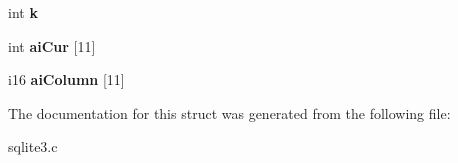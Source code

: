 \begin{DoxyCompactItemize}
\item 
int {\bfseries k}\hypertarget{structWhereScan_a51bec89116185e0a611cd4d7fed8847c}{}\label{structWhereScan_a51bec89116185e0a611cd4d7fed8847c}

\item 
int {\bfseries ai\+Cur} \mbox{[}11\mbox{]}\hypertarget{structWhereScan_a0795799165cb58df1402063f03daf1a6}{}\label{structWhereScan_a0795799165cb58df1402063f03daf1a6}

\item 
i16 {\bfseries ai\+Column} \mbox{[}11\mbox{]}\hypertarget{structWhereScan_a5a55fc1ad5f48ef922ea89c9603f8f38}{}\label{structWhereScan_a5a55fc1ad5f48ef922ea89c9603f8f38}

\end{DoxyCompactItemize}


The documentation for this struct was generated from the following file\+:\begin{DoxyCompactItemize}
\item 
sqlite3.\+c\end{DoxyCompactItemize}
